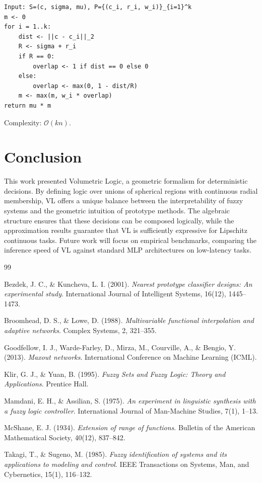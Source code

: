 \documentclass[11pt]{article}
\begin{document}
\begin{lstlisting}
Input: S=(c, sigma, mu), P={(c_i, r_i, w_i)}_{i=1}^k
m <- 0
for i = 1..k:
    dist <- ||c - c_i||_2
    R <- sigma + r_i
    if R == 0:
        overlap <- 1 if dist == 0 else 0
    else:
        overlap <- max(0, 1 - dist/R)
    m <- max(m, w_i * overlap)
return mu * m
\end{lstlisting}

Complexity: $\mathcal{O}(kn)$.

\section{Conclusion}

This work presented Volumetric Logic, a geometric formalism for deterministic decisions. By defining logic over unions of spherical regions with continuous radial membership, VL offers a unique balance between the interpretability of fuzzy systems and the geometric intuition of prototype methods. The algebraic structure ensures that these decisions can be composed logically, while the approximation results guarantee that VL is sufficiently expressive for Lipschitz continuous tasks. Future work will focus on empirical benchmarks, comparing the inference speed of VL against standard MLP architectures on low-latency tasks.

\begin{thebibliography}{99}

Bezdek, J. C., \& Kuncheva, L. I. (2001).
\textit{Nearest prototype classifier designs: An experimental study}.
International Journal of Intelligent Systems, 16(12), 1445--1473.

Broomhead, D. S., \& Lowe, D. (1988).
\textit{Multivariable functional interpolation and adaptive networks}.
Complex Systems, 2, 321--355.

Goodfellow, I. J., Warde-Farley, D., Mirza, M., Courville, A., \& Bengio, Y. (2013).
\textit{Maxout networks}.
International Conference on Machine Learning (ICML).

Klir, G. J., \& Yuan, B. (1995).
\textit{Fuzzy Sets and Fuzzy Logic: Theory and Applications}.
Prentice Hall.

Mamdani, E. H., \& Assilian, S. (1975).
\textit{An experiment in linguistic synthesis with a fuzzy logic controller}.
International Journal of Man-Machine Studies, 7(1), 1--13.

McShane, E. J. (1934).
\textit{Extension of range of functions}.
Bulletin of the American Mathematical Society, 40(12), 837--842.

Takagi, T., \& Sugeno, M. (1985).
\textit{Fuzzy identification of systems and its applications to modeling and control}.
IEEE Transactions on Systems, Man, and Cybernetics, 15(1), 116--132.

\end{thebibliography}
\end{document}
